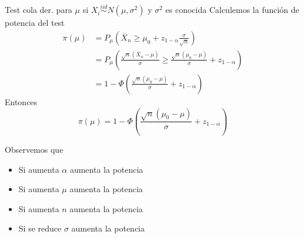 \documentclass{beamer}
\theoremstyle{definition}
\begin{document}
\begin{frame}{\color{rosee}Test cola der. para $\mu$ si $X_i\stackrel{iid}{\sim}N(\mu,\sigma^2)$ y $\sigma^2$ es conocida}\small
  Calculemos la funci\'on de potencia del test
  \begin{align*}
    \pi(\mu) 
    &= P_{\mu} \left( \overline{X}_n \geq \mu_0 + z_{1-\alpha}
      \frac{\sigma}{\sqrt{n}} \right)\\ 
    &=  P_{\mu} \left( \frac{\sqrt{n}(\overline{X}_n -
      \mu)}{\sigma} \geq \frac{\sqrt{n}(\mu_0-\mu)}{\sigma} +
      z_{1-\alpha} \right)\\
    &= 1 -
      \Phi\left(\frac{\sqrt{n}(\mu_0-\mu)}{\sigma} + z_{1-\alpha} \right)
  \end{align*}
  Entonces
  $$ \pi(\mu) = 1-
  \Phi\left(\frac{\sqrt{n}(\mu_0-\mu)}{\sigma} + z_{1-\alpha} \right)$$

    Observemos que 
  \begin{itemize}
  \item Si aumenta $\alpha$ aumenta la potencia 
  \item Si aumenta $\mu$ aumenta la potencia
  \item Si aumenta $n$ aumenta la potencia
  \item Si se reduce $\sigma$ aumenta la potencia
  \end{itemize}
\end{frame}
\end{document}

